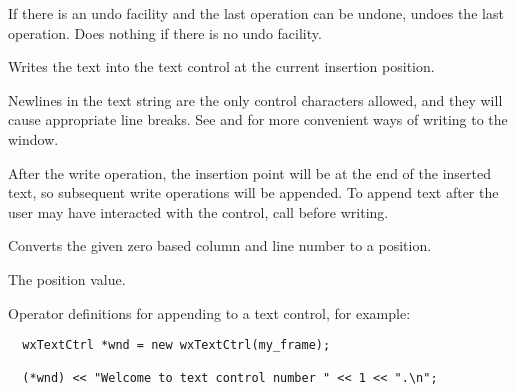 
If there is an undo facility and the last operation can be undone, undoes the last operation. Does nothing
if there is no undo facility.

\label{wxtextctrlwritetext}


Writes the text into the text control at the current insertion position.




Newlines in the text string
are the only control characters allowed, and they will cause appropriate
line breaks.  See  and  for more convenient ways of writing to the window.

After the write operation, the insertion point will be at the end of the inserted text, so subsequent write operations will be appended. To append text after the user may have interacted with the control, call  before writing.

\label{wxtextctrlxytoposition}


Converts the given zero based column and line number to a position.





The position value.

\label{wxtextctrlinsert}







Operator definitions for appending to a text control, for example:

\begin{verbatim}
  wxTextCtrl *wnd = new wxTextCtrl(my_frame);

  (*wnd) << "Welcome to text control number " << 1 << ".\n";
\end{verbatim}

